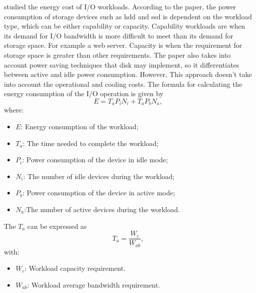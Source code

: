 \citet{Li2014} studied the energy cost of I/O workloads. According to the paper, the power consumption of storage devices such as \ac{hdd} and \ac{ssd} is dependent on the workload type, which can be either capability or capacity. Capability workloads are when its demand for I/O bandwidth is more difficult to meet than its demand for storage space. For example a web server. Capacity is when the requirement for storage space is greater than other requirements. The paper also takes into account power saving techniques that disk may implement, so it differentiates between active and idle power consumption. However, This approach doesn't take into account the operational and cooling costs.
The formula for calculating the energy consumption of the I/O operation is given by
%
\begin{equation}
    E = T_a P_i N_i + T_a P_b N_a,
\end{equation}
%
where:
\begin{itemize}
    \item $E$: Energy consumption of the workload;
    \item $T_a$: The time needed to complete the workload;
    \item $P_i$: Power consumption  of the device in idle mode;
    \item $N_i$: The number of idle devices during the workload;
    \item $P_b$: Power consumption of the device in active mode;
    \item $N_a$:The number of active devices during the workload.
\end{itemize}
%
The $T_a$ can be expressed as 
%
\begin{equation}
    T_a = \frac{W_c}{W_{ab}},
\end{equation}
with:
\begin{itemize}
    \item $W_c$: Workload capacity requirement.
    \item $W_{ab}$: Workload average bandwidth requirement.
\end{itemize}

